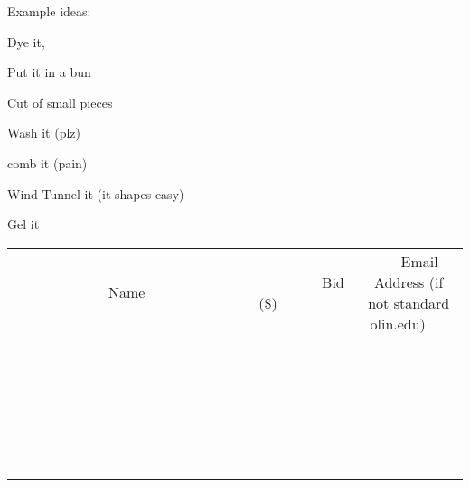 \documentclass[11pt]{article}
\begin{document}
Example ideas:

Dye it,

Put it in a bun

Cut of small pieces

Wash it (plz)

comb it (pain)

Wind Tunnel it (it shapes easy)

Gel it \\
					[6ex]
					\begin{tabular}{c c c}
						~~~~~~~~~~~~~Name~~~~~~~~~~~~~ & ~~~~~~~~~Bid (\$)~~~~~~~~~ & ~~~Email Address (if not standard olin.edu)~~~ \\
				
 & & \\
\hline
 & & \\
\hline
 & & \\
\hline
 & & \\
\hline
 & & \\
\hline
 & & \\
\hline
 & & \\
\hline
 & & \\
\hline
 & & \\
\hline
 & & \\
\hline
 & & \\
\hline
 & & \\
\hline
 & & \\
\hline
 & & \\
\hline
 & & \\
\hline
 & & \\
\hline
 & & \\
\hline
 & & \\
\hline
 & & \\
\hline
 & & \\
\hline
 & & \\
\hline
 & & \\
\hline
 & & \\
\hline
 & & \\
\hline
 & & \\
\hline
 & & \\
\hline
					\end{tabular}
					\clearpage
				
\end{document}
